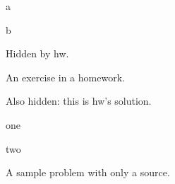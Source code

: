 \documentclass[solutions=false]{akizumi-hw}
\begin{document}
\begin{problem}
\begin{parts}\item a \item b\end{parts}
\begin{solution}Hidden by hw.\end{solution}
\end{problem}
\begin{exercise}
An exercise in a homework.
\end{exercise}
\begin{solution}Also hidden: this is hw's solution.\end{solution}
\begin{exercises}\item one \item two\end{exercises}
\begin{example-problem}[source=APCS 2024]
A sample problem with only a source.
\end{example-problem}
\end{document}
